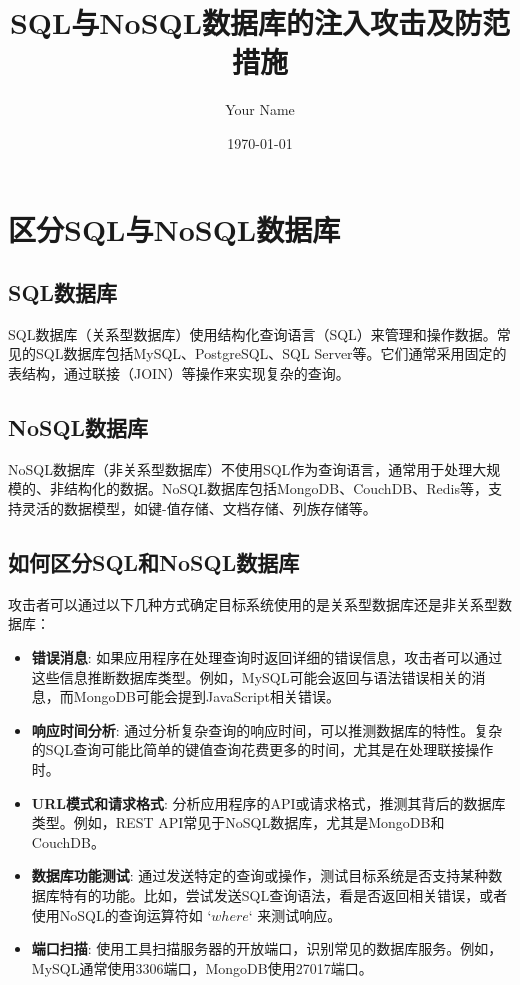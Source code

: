 \documentclass{article}
\title{SQL与NoSQL数据库的注入攻击及防范措施}
\author{Your Name}
\date{\today}
\begin{document}
\maketitle

\section{区分SQL与NoSQL数据库}

\subsection{SQL数据库}
SQL数据库（关系型数据库）使用结构化查询语言（SQL）来管理和操作数据。常见的SQL数据库包括MySQL、PostgreSQL、SQL Server等。它们通常采用固定的表结构，通过联接（JOIN）等操作来实现复杂的查询。

\subsection{NoSQL数据库}
NoSQL数据库（非关系型数据库）不使用SQL作为查询语言，通常用于处理大规模的、非结构化的数据。NoSQL数据库包括MongoDB、CouchDB、Redis等，支持灵活的数据模型，如键-值存储、文档存储、列族存储等。

\subsection{如何区分SQL和NoSQL数据库}
攻击者可以通过以下几种方式确定目标系统使用的是关系型数据库还是非关系型数据库：
\begin{itemize}
    \item \textbf{错误消息}: 如果应用程序在处理查询时返回详细的错误信息，攻击者可以通过这些信息推断数据库类型。例如，MySQL可能会返回与语法错误相关的消息，而MongoDB可能会提到JavaScript相关错误。
    \item \textbf{响应时间分析}: 通过分析复杂查询的响应时间，可以推测数据库的特性。复杂的SQL查询可能比简单的键值查询花费更多的时间，尤其是在处理联接操作时。
    \item \textbf{URL模式和请求格式}: 分析应用程序的API或请求格式，推测其背后的数据库类型。例如，REST API常见于NoSQL数据库，尤其是MongoDB和CouchDB。
    \item \textbf{数据库功能测试}: 通过发送特定的查询或操作，测试目标系统是否支持某种数据库特有的功能。比如，尝试发送SQL查询语法，看是否返回相关错误，或者使用NoSQL的查询运算符如 `$where$` 来测试响应。
    \item \textbf{端口扫描}: 使用工具扫描服务器的开放端口，识别常见的数据库服务。例如，MySQL通常使用3306端口，MongoDB使用27017端口。
\end{itemize}
\end{document}
